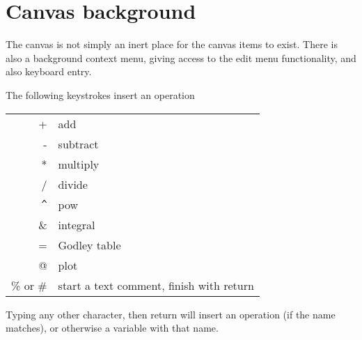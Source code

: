 \section{Canvas background}

The canvas is not simply an inert place for the canvas items to
exist. There is also a background context menu, giving access to the
edit menu functionality, and also keyboard entry.

The following keystrokes insert an operation

\begin{tabular}{rl}
+ & add\\
- & subtract \\
* & multiply\\
/ & divide\\
\verb+^+ & pow\\
\& & integral\\
= & Godley table\\
@ & plot\\
\% or \# & start a text comment, finish with return\\
\end{tabular}

Typing any other character, then return will insert an operation (if
the name matches), or otherwise a variable with that name.
